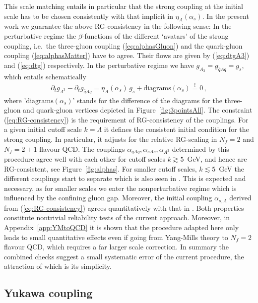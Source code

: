\documentclass[%
reprint,
superscriptaddress,
showpacs,preprintnumbers,
 amsmath,amssymb,
 aps,
prd,
]{revtex4-1}
\def\Fig#1{Figure~\ref{#1}}
\def\eq#1{(\ref{#1})}
\def\app#1{Appendix~\ref{#1}}
\begin{document}
This scale matching entails in particular that the strong coupling at
the initial scale has to be chosen consistently with that implicit in
$\eta_A(\alpha_s)$. In the present work we guarantee the above
RG-consistency in the following sense: In the perturbative regime the
$\beta$-functions of the different `avatars' of the strong coupling,
i.e.\ the three-gluon coupling \eq{eq:alphasGluon} and the quark-gluon
coupling \eq{eq:alphasMatter} have to agree. Their flows are given by
\eq{eq:dtgA3} and \eq{eq:dtg} respectively. In the perturbative regime
we have $g_{A_3} = g_{\bar q A q} = g_s$, which entails schematically
%
\begin{align}
  \partial_t g_{A^3}-\partial_t g_{\bar q A q}= \eta_A(\alpha_s)\, g_s   +
  \textrm{diagrams}(\alpha_s) \stackrel{!}{=} 0\,, 
\label{eq:RG-consistency}\end{align}
%
where '$\textrm{diagrams}(\alpha_s)$' stands for the difference of the
diagrams for the three-gluon and quark-gluon vertices depicted in
\Fig{fig:3pointsAll}. The constraint \eq{eq:RG-consistency} is the
requirement of RG-consistency of the couplings. For a given initial
cutoff scale $k=\Lambda$ it defines the consistent initial condition
for the strong coupling. In particular, it adjusts for the relative
RG-scaling in $N_f=2$ and $N_f=2+1$ flavour QCD. The couplings
$\alpha_{\bar q Aq},\alpha_{\bar s As},\alpha_{A^3}$ determined by
this procedure agree well with each other for cutoff scales
$k\gtrsim 5$\, GeV, and hence are RG-consistent, see
\Fig{fig:alphas}. For smaller cutoff scales, $k\lesssim 5$\, GeV the
different couplings start to separate which is also seen in
\cite{Cyrol:2017ewj}. This is expected and necessary, as for smaller
scales we enter the nonperturbative regime which is influenced by the
confining gluon gap. Moreover, the initial coupling
$\alpha_{s,\Lambda}$ derived from \eq{eq:RG-consistency} agrees
quantitatively with that in \cite{Cyrol:2017ewj}. Both properties
constitute nontrivial reliability tests of the current
approach. Moreover, in \app{app:YMtoQCD} it is shown that the
procedure adapted here only leads to small quantitative effects even
if going from Yang-Mills theory to $N_f=2$ flavour QCD, which requires
a far larger scale correction. In summary the combined checks suggest
a small systematic error of the current procedure, the attraction of
which is its simplicity.


\subsection{Yukawa coupling}\label{sec:Yukawa}
\end{document}
